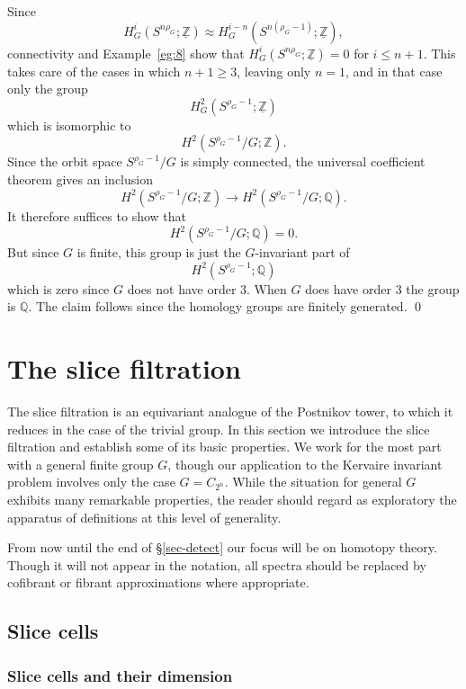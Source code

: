\documentclass{amsart}
\theoremstyle{definition}
\theoremstyle{remark}
\newenvironment{pf}{\bigskip{\em Proof:\/}}{\qed\medskip}
\newcommand{\Q}{{\mathbb Q}}
\newcommand{\Z}{{\mathbb Z}}
\newcommand{\Zm}{\underline{\Z}}
\newcommand{\ztn}{C_{2^{n}}}
\begin{document}
\begin{pf}
Since 
\[
H^{i}_{G}(S^{n\rho_{G}};\Zm) \approx 
H^{i-n}_{G}(S^{n(\rho_{G}-1)};\Zm),
\]
connectivity and Example~\ref{eg:8} show that
$H^{i}_{G}(S^{n\rho_{G}};\Zm) = 0$ for $i\le n+1$.   This takes care
of the cases in which $n+1\ge 3$, leaving only $n=1$, and in that case
only the group
\[
H^{2}_{G}(S^{\rho_{G}-1};\Zm)
\]
which is isomorphic to 
\[
H^{2}(S^{\rho_{G}-1}/G;\Z).
\]
Since the orbit space $S^{\rho_{G}-1}/G$ is simply connected, the
universal coefficient theorem gives an inclusion
\[
H^{2}(S^{\rho_{G}-1}/G;\Z)\to
H^{2}(S^{\rho_{G}-1}/G;\Q).
\]
It therefore suffices to show that
\[
H^{2}(S^{\rho_{G}-1}/G;\Q)=0.
\]
But since $G$ is finite, this group is just the $G$-invariant part of 
\[
H^{2}(S^{\rho_{G}-1};\Q)
\]
which is zero since $G$ does not have order $3$.  When $G$ does have
order $3$ the group is $\Q$.  The claim follows since the homology
groups are finitely generated.
\end{pf}

\section{The slice filtration}
\label{sec:ths-slice-filtration}

The slice filtration is an equivariant analogue of the Postnikov
tower, to which it reduces in the case of the trivial group.  In this
section we introduce the slice filtration and establish some of its
basic properties.  We work for the most part with a general finite
group $G$, though our application to the Kervaire invariant problem
involves only the case $G=\ztn$.  While the situation for general $G$
exhibits many remarkable properties, the reader should regard as
exploratory the apparatus of definitions at this level of generality.

From now until the end of \S\ref{sec-detect} our focus will be on
homotopy theory.  Though it will not appear in the notation, all
spectra should be replaced by cofibrant or fibrant approximations
where appropriate.  

\subsection{Slice cells}
\label{sec:slice-cells}

\subsubsection{Slice cells and their dimension}
\label{sec:slice-cells-and-dimensions}
\end{document}
